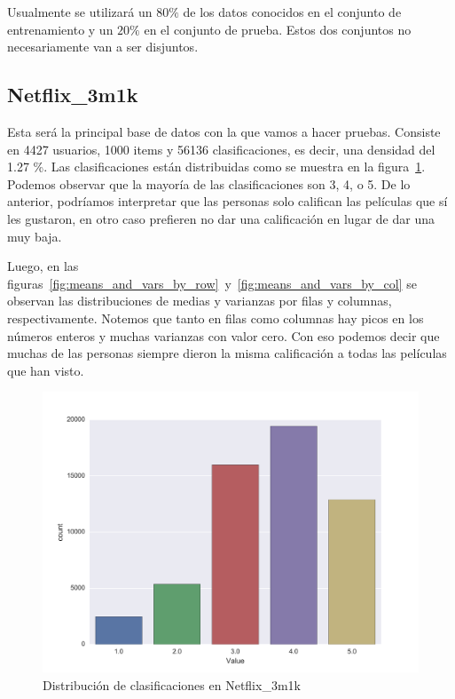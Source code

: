 \documentclass[spanish]{article}                 %
\numberwithin{equation}{section}                 %
\theoremstyle{definition}
\begin{document}
Usualmente se utilizará un $80\%$ de los datos conocidos en el conjunto de entrenamiento y un $20\%$ en el conjunto de prueba. Estos dos conjuntos no necesariamente van a ser disjuntos.

\subsection{Netflix\_3m1k}
Esta será la principal base de datos con la que vamos a hacer pruebas. Consiste en 4427 usuarios, 1000 items y 56136 clasificaciones, es decir, una densidad del 1.27 \%. Las clasificaciones están distribuidas como se muestra en la figura~\ref{fig:netflix_data_distribution}. Podemos observar que la mayoría de las clasificaciones son 3, 4, o 5. De lo anterior, podríamos interpretar que las personas solo califican las películas que sí les gustaron, en otro caso prefieren no dar una calificación en lugar de dar una muy baja.

Luego, en las figuras~\ref{fig:means_and_vars_by_row}~y~\ref{fig:means_and_vars_by_col} se observan las distribuciones de medias y varianzas por filas y columnas, respectivamente. Notemos que tanto en filas como columnas hay picos en los números enteros y muchas varianzas con valor cero. Con eso podemos decir que muchas de las personas siempre dieron la misma calificación a todas las películas que han visto.


\begin{figure}[ht]
    \centering
    \includegraphics[width=0.4\linewidth]{../Results/Netflix/Plots/Data_distribution.png}
    \caption{Distribución de clasificaciones en Netflix\_3m1k}\label{fig:netflix_data_distribution}
\end{figure}
\end{document}
